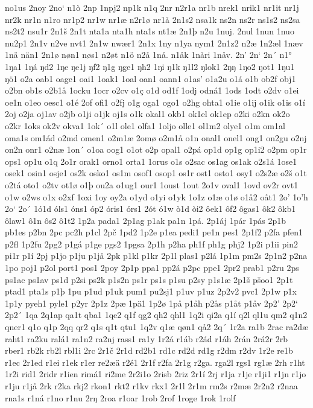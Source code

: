 no1us
2noy
2no`
n1ò
2np
1npj2
np1k
n1q
2nr
n2r1a
nr1b
nrek1
nrik1
nr1it
nr1j
nr2k
nr1n
n1ro
nr1p2
nr1w
nr1æ
n2r1ø
nr1å
2n1s2
nsa1k
ns2n
ns2r
ns1s2
ns2sa
ns2t2
nsu1r
2n1š
2n1t
nta1a
nta1h
nta1s
nt1æ
2n1þ
n2u
1nuj.
2nul
1nun
1nuo
nu2p1
2n1v
n2ve
nvt1
2n1w
nwær1
2n1x
1ny
n1ya
nym1
2n1z2
n2æ
1n2æl
1næv
1nä
nän1
2n1ø
nøn1
nøs1
n2øt
n1ö
n2å
1nå.
n1åk
1nåri
1nåv.
2n'
2n`
2n´
n1°
1ŋa1
1ŋá
ŋd2
1ŋe
ŋe1j
ŋf2
ŋ1g
ŋge1
ŋh2
1ŋi
ŋ1k
ŋ1l2
ŋlok1
2ŋŋ
1ŋo2
ŋot1
1ŋu1
ŋö1
o2a
oab1
oage1
oai1
1oak1
1oal
oan1
oann1
o1as'
o1a2u
o1á
o1b
ob2f
obj1
o2bn
ob1s
o2b1å
1ocku
1ocr
o2cv
o1ç
o1d
od1f
1odj
odná1
1ods
1odt
o2dv
o1ei
oe1n
o1eo
oesc1
o1é
2of
ofi1
o2fj
o1g
oga1
ogo1
o2hg
ohta1
o1ie
o1ij
o1ik
o1is
o1í
2oj
o2ja
oj1av
o2jb
o1ji
o1jk
oj1s
o1k
okal1
okb1
ok1el
ok1ep
o2ki
o2kn
ok2o
o2kr
1oks
ok2v
okva1
1ok´
o1l
ole1
olfa1
1oljo
olle1
ol1m2
olye1
o1m
om1al
oma1s
om1ád
o2md
omen1
o2m1æ
2omø
o2m1å
o1n
onal1
onel1
ong1
on2gu
o2nj
on2n
onr1
o2næ
1on´
o1oa
oog1
o1ot
o2p
opal1
o2pá
op1d
op1g
op1i2
o2pm
op1r
ops1
op1u
o1q
2o1r
orak1
orno1
orta1
1orus
o1s
o2sac
os1ag
os1ak
o2s1á
1ose1
osek1
osin1
osje1
os2k
osko1
os1m
osof1
osop1
os1r
ost1
osto1
osy1
o2s2æ
o2š
o1t
o2tá
oto1
o2tv
ot1ø
o1þ
ou2a
o1ug1
our1
1oust
1out
2o1v
oval1
1ovd
ov2r
ovt1
o1w
o2ws
o1x
o2xf
1oxi
1oy
oy2a
o1yd
o1yi
o1yk
1o1z
o1æ
o1ø
o1å2
oåt1
2o'
1o'h
2o`
2o´
1ó1d
óls1
óns1
óp2
óris1
órs1
2ót
ó1w
ò1d
òi2
ôek1
ôf2
ôgas1
ôk2
ôkb1
ôlaw1
ô1n
ôs2
ô1t2
1p2a
pada1
2p1ag
p1ak
pa1n
1pá.
2p1áj
1pár
1pás
2p1b
pb1es
p2bn
2pc
pc2h
p1cl
2pč
1pd2
1p2e
p1ea
pedi1
pe1n
pes1
2p1f2
p2fa
pfen1
p2fl
1p2fu
2pg2
p1gá
p1ge
pgs2
1pgsa
2p1h
p2ha
ph1f
ph1g
phj2
1p2i
p1ii
pin2
pi1r
p1í
2pj
p1jo
p1ju
p1jå
2pk
p1kl
p1kr
2p1l
plas1
p2lá
1p1m
pm2s
2p1n2
p2na
1po
poj1
p2ol
port1
pos1
2poy
2p1p
ppa1
pp2á
p2pc
ppe1
2pr2
prab1
p2ru
2ps
ps1ac
ps1av
ps1d
p2si
ps2k
p1s2n
ps1r
ps1s
p1su
p2sy
p1s1æ
2p1š
pšoo1
2p1t
ptad1
pta1s
p1þ
1pu
p1ud
p1uk
pum1
pu2sj1
p1uv
p1uz
2p2v2
pvc1
2p1w
p1x
1p1y
pyeh1
pyle1
p2yr
2p1z
2pæ
1pä1
1p2ø
1på
p1åh
p2ås
p1åt
p1åv
2p2'
2p2`
2p2´
1qa
2q1ap
qa1t
qba1
1qe2
q1f
qg2
qh2
qhl1
1q2i
qi2a
q1í
q2l
ql1u
qm2
q1n2
qner1
q1o
q1p
2qq
qr2
q1s
q1t
qtu1
1q2v
q1æ
qøn1
qå2
2q´
1r2a
ra1b
2rac
ra2dæ
raht1
ra2ku
ralá1
ra1n2
ra2nj
rass1
ra1y
1r2á
r1áb
r2ád
r1áh
2rán
2rá2r
2rb
rber1
rb2k
rb2l
rbl1i
2rc
2r1č
2r1d
rd2b1
rd1c
rd2d
rd1g
r2dm
r2dv
1r2e
re1b
r1ec
2r1ed
r1ei
r1ek
r1er
re2æä
r2é1
2r1f
r2fa
2r1g
r2ga.
rga2l
rgs1
rg1æ
2rh
r1ht
1r2i
rid1
2ridr
r1ien
rimá1
ri2me
2r2i1o
2risb
2riz
2r1í
2rj
r1ja
r1je
r1ji1
r1jn
r1jo
r1ju
r1jå
2rk
r2ka
rkj2
rkon1
rkt2
r1kv
rkx1
2r1l
2r1m
rm2s
r2mæ
2r2n2
r2naa
rna1s
r1ná
r1no
r1nu
2rŋ
2roa
r1oar
1rob
2rof
1roge
1rok
1rolf
